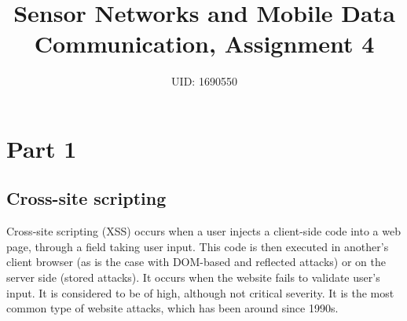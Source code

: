 \documentclass[11pt,journal]{article}
\begin{document}
	\title{Sensor Networks and Mobile Data Communication, Assignment 4}
	
	\author{UID: 1690550}%
	



	
	
	\maketitle
	
	
	
	
	\section{Part 1}
	\subsection{Cross-site scripting}
	Cross-site scripting (XSS) occurs when a user injects a client-side code into a web page, through a field taking user input. This code is then executed in another's client browser (as is the case with DOM-based and reflected attacks) or on the server side (stored attacks). It occurs when the website fails to validate user's input. It is considered to be of high, although not critical severity\cite{xss review}. It is the most common type of website attacks, which has been around since 1990s\cite{xss2}.
	
\end{document}
